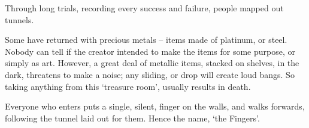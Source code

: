 \begin{multicols}{2}
Through long trials, recording every success and failure, people mapped out tunnels.

Some have returned with precious metals -- items made of platinum, or steel.
Nobody can tell if the creator intended to make the items for some purpose, or simply as art.
However, a great deal of metallic items, stacked on shelves, in the dark, threatens to make a noise; any sliding, or drop will create loud bangs.
So taking anything from this `treasure room', usually results in death.

Everyone who enters puts a single, silent, finger on the walls, and walks forwards, following the tunnel laid out for them.
Hence the name, `the Fingers'.

\end{multicols}


\printindex[history]

\printindex[talismans]

\printindex

